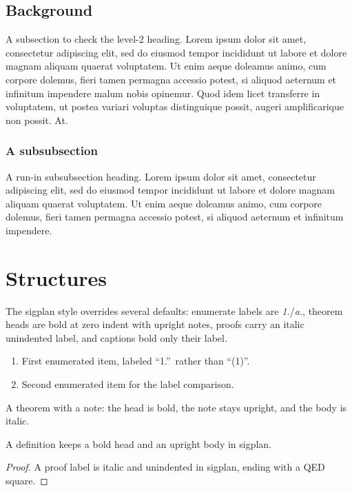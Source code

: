 \documentclass[sigplan]{acmart}
\begin{document}
\subsection{Background}
A subsection to check the level-2 heading. Lorem ipsum dolor sit amet,
consectetur adipiscing elit, sed do eiusmod tempor incididunt ut labore et dolore
magnam aliquam quaerat voluptatem. Ut enim aeque doleamus animo, cum corpore
dolemus, fieri tamen permagna accessio potest, si aliquod aeternum et infinitum
impendere malum nobis opinemur. Quod idem licet transferre in voluptatem, ut
postea variari voluptas distinguique possit, augeri amplificarique non possit. At.

\subsubsection{A subsubsection}
A run-in subsubsection heading. Lorem ipsum dolor sit amet, consectetur
adipiscing elit, sed do eiusmod tempor incididunt ut labore et dolore magnam
aliquam quaerat voluptatem. Ut enim aeque doleamus animo, cum corpore dolemus,
fieri tamen permagna accessio potest, si aliquod aeternum et infinitum impendere.

\section{Structures}
The sigplan style overrides several defaults: enumerate labels are
\emph{1.}/\emph{a.}, theorem heads are bold at zero indent with upright notes,
proofs carry an italic unindented label, and captions bold only their label.

\begin{enumerate}
\item First enumerated item, labeled ``1.''\ rather than ``(1)''.
\item Second enumerated item for the label comparison.
\end{enumerate}

\begin{theorem}[Fermat]
A theorem with a note: the head is bold, the note stays upright, and the body is
italic.
\end{theorem}

\begin{definition}
A definition keeps a bold head and an upright body in sigplan.
\end{definition}

\begin{proof}
A proof label is italic and unindented in sigplan, ending with a QED square.
\end{proof}
\end{document}
